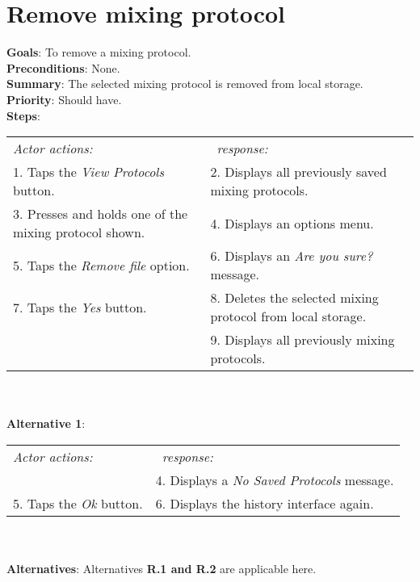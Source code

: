 \section{Remove mixing protocol}
 \label{removedist}
  \textbf{Goals}: To remove a mixing protocol.\\
  \textbf{Preconditions}: None.\\
  \textbf{Summary}: The selected mixing protocol is removed from local storage.\\
  \textbf{Priority}: Should have.\\
  \textbf{Steps}: \\
    \begin{tabular}{ p{} p{} }
  	\emph{Actor actions:} & \emph{\projectname\ response:} \\
    1. Taps the \emph{View Protocols} button. & 2. Displays all previously saved mixing protocols.\\
    3. Presses and holds one of the mixing protocol shown. & 4. Displays an options menu. \\
    5. Taps the \emph{Remove file} option. & 6. Displays an \emph{Are you sure?} message.\\
    7. Taps the \emph{Yes} button. & 8. Deletes the selected mixing protocol from local storage. \\
     & 9. Displays all previously mixing protocols.\\
    \end{tabular}
                \\
     \\\textbf{Alternative 1}: \\
    \begin{tabular}{ p{} p{} }
  	\emph{Actor actions:} & \emph{\projectname\ response:} \\
            & 4. Displays a \emph{No Saved Protocols} message. \\
    5. Taps the \emph{Ok} button. & 6. Displays the history interface again. \\
    \end{tabular}
    \\
    \\\textbf{Alternatives}: Alternatives \textbf{R.1 and R.2} are applicable here.
    
